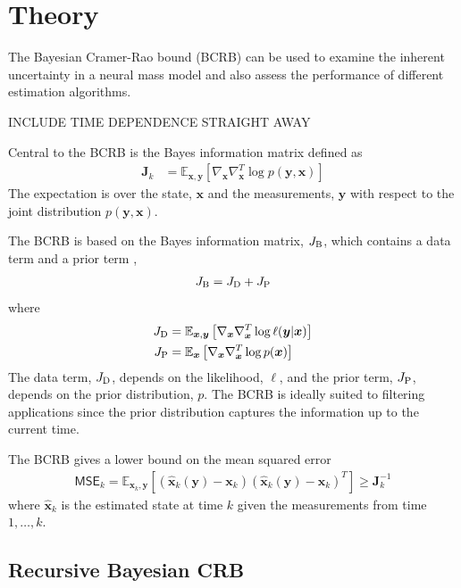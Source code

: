 \documentclass{article}
\renewcommand{\vec}[1]{\ensuremath{{\boldsymbol #1}}}
\newcommand{\mat}[1]{\ensuremath{\boldsymbol{#1}}}
\begin{document}
\section{Theory}

The Bayesian Cramer-Rao bound (BCRB) can be used to examine the inherent uncertainty in a neural mass model and also assess the performance of different estimation algorithms. 

INCLUDE TIME DEPENDENCE STRAIGHT AWAY

Central to the BCRB is the Bayes information matrix defined as
\begin{align}
	\mat J_k &= \mathbb E_{\vec x,\vec y}\left[ \nabla_{\vec x}\nabla_{\vec x}^T \log p(\vec y,\vec x) \right] 
\end{align}
The expectation is over the state, $\vec x$ and the measurements, $\vec y$ with respect to the joint distribution $p(\vec y,\vec x)$.

The BCRB is based on the Bayes information matrix, $J_{\rm B}$, which contains a data term and a prior term \cite{sdf},
\begin{align}
	J_{\rm B} = J_{\rm D} + J_{\rm P}
\end{align}
where 
\begin{align}
	J_{\rm D} &= \mathbb E_{\vec x,\vec y}\left[ \nabla_{\vec x}\nabla_{\vec x}^T \log \ell(\vec y|\vec x) \right] \\
	J_{\rm P} &= \mathbb E_{\vec x}\left[ \nabla_{\vec x}\nabla_{\vec x}^T \log p(\vec x) \right]
\end{align}
The data term, $J_{\rm D}$, depends on the likelihood, $\ell$, and the prior term, $J_{\rm P}$, depends on the prior distribution, $p$. The BCRB is ideally suited to filtering applications since the prior distribution captures the information up to the current time.

The BCRB gives a lower bound on the mean squared error
\begin{align}
	\mathsf{MSE}_k = \mathbb E_{\vec x_k,\vec y} [(\hat{\vec x}_k(\vec y) - \vec x_k)(\hat{\vec x}_k(\vec y) - \vec x_k)^T] \ge \mat J_{k}^{-1}
\end{align}
where $\hat{\vec x}_k$ is the estimated state at time $k$ given the measurements from time $1,\ldots,k$.

\subsection{Recursive Bayesian CRB}
\end{document}
